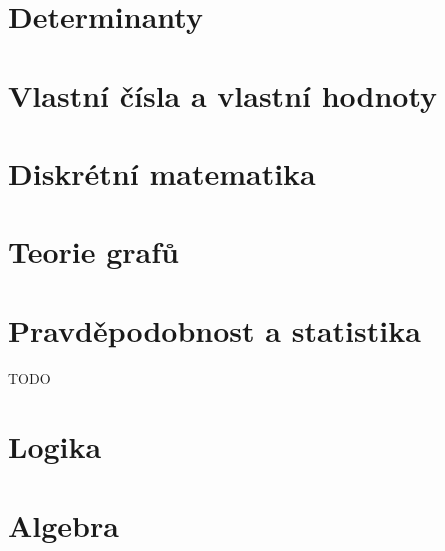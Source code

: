 \section{Determinanty}


\section{Vlastní čísla a vlastní hodnoty}


\section{Diskrétní matematika}


\section{Teorie grafů}


\section{Pravděpodobnost a statistika}
TODO

\section{Logika}


\section{Algebra}


